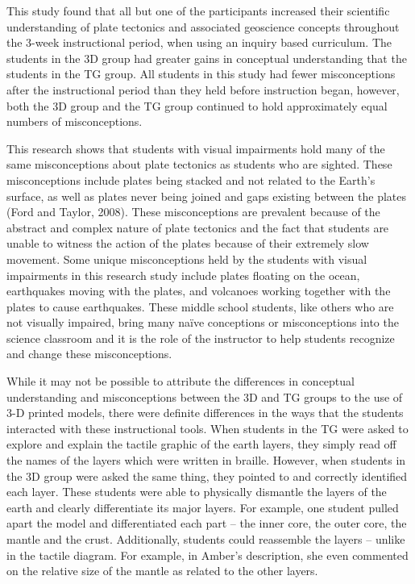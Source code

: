 \documentclass[11.5pt]{sig-alternate} %
\begin{document}
\begin{large}
This study found that all but one of the participants increased their scientific understanding of plate tectonics and associated geoscience concepts throughout the 3-week instructional period, when using an inquiry based curriculum. The students in the 3D group had greater gains in conceptual understanding that the students in the TG group.  All students in this study had fewer misconceptions after the instructional period than they held before instruction began, however, both the 3D group and the TG group continued to hold approximately equal numbers of misconceptions.  

This research shows that students with visual impairments hold many of the same misconceptions about plate tectonics as students who are sighted.  These misconceptions include plates being stacked and not related to the Earth’s surface, as well as plates never being joined and gaps existing between the plates (Ford and Taylor, 2008). These misconceptions are prevalent because of the abstract and complex nature of plate tectonics and the fact that students are unable to witness the action of the plates because of their extremely slow movement.  Some unique misconceptions held by the students with visual impairments in this research study include plates floating on the ocean, earthquakes moving with the plates, and volcanoes working together with the plates to cause earthquakes.  These middle school students, like others who are not visually impaired, bring many naïve conceptions or misconceptions into the science classroom and it is the role of the instructor to help students recognize and change these misconceptions.  

While it may not be possible to attribute the differences in conceptual understanding and misconceptions between the 3D and TG groups to the use of 3-D printed models, there were definite differences in the ways that the students interacted with these instructional tools.  When students in the TG were asked to explore and explain the tactile graphic of the earth layers, they simply read off the names of the layers which were written in braille.  However, when students in the 3D group were asked the same thing, they pointed to and correctly identified each layer.  These students were able to physically dismantle the layers of the earth and clearly differentiate its major layers.  For example, one student pulled apart the model and differentiated each part – the inner core, the outer core, the mantle and the crust.  Additionally, students could reassemble the layers – unlike in the tactile diagram. For example, in Amber’s description, she even commented on the relative size of the mantle as related to the other layers.  


\end{large}
\end{document}
